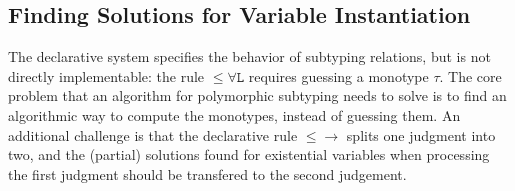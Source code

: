 
\begin{comment}
The conclusions of the declarative subtyping rules do not overlap with
each other, except for the judgments with a shape of
$\forall a. A \le \forall a. B$. In this case, an eager application of
Rule~$\mathtt{{\le}\forall R}$ introduces type variable into the context
earlier, which results in an easier problem than the application of
Rule~$\mathtt{{\le}\forall L}$.
\end{comment}

\subsection{Finding Solutions for Variable Instantiation}

The declarative system specifies the behavior of subtyping relations,
but is not directly implementable: the rule $\mathtt{{\le}\forall L}$
requires guessing a monotype $\tau$.
The core problem that an algorithm for polymorphic 
subtyping needs to solve is to find an algorithmic way to compute the 
monotypes, instead of guessing them. An additional challenge is that
the declarative rule $\mathtt{{\le}{\to}}$ splits one judgment
into two, and the (partial) solutions found for existential variables when
processing the first judgment should be transfered to the second judgement.

